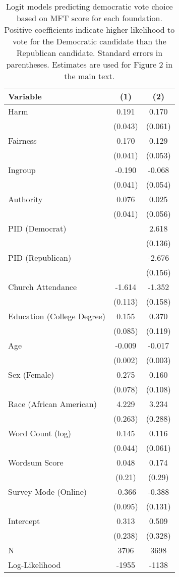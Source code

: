 \begin{table}[ht]
\centering
\caption{Logit models predicting democratic vote choice based on
           MFT score for each foundation. Positive coefficients indicate higher likelihood
           to vote for the Democratic candidate than the Republican candidate. Standard errors 
           in parentheses. Estimates are used for Figure 2 in the main text.} 
\label{tab:logit_vote}
\begingroup\footnotesize
\begin{tabular}{lcc}
  \hline
Variable & (1) & (2) \\ 
  \hline
Harm &  0.191 &  0.170 \\ 
   & (0.043) & (0.061) \\ 
  Fairness &  0.170 &  0.129 \\ 
   & (0.041) & (0.053) \\ 
  Ingroup & -0.190 & -0.068 \\ 
   & (0.041) & (0.054) \\ 
  Authority &  0.076 &  0.025 \\ 
   & (0.041) & (0.056) \\ 
  PID (Democrat) &  &  2.618 \\ 
   &  & (0.136) \\ 
  PID (Republican) &  & -2.676 \\ 
   &  & (0.156) \\ 
  Church Attendance & -1.614 & -1.352 \\ 
   & (0.113) & (0.158) \\ 
  Education (College Degree) &  0.155 &  0.370 \\ 
   & (0.085) & (0.119) \\ 
  Age & -0.009 & -0.017 \\ 
   & (0.002) & (0.003) \\ 
  Sex (Female) &  0.275 &  0.160 \\ 
   & (0.078) & (0.108) \\ 
  Race (African American) &  4.229 &  3.234 \\ 
   & (0.263) & (0.288) \\ 
  Word Count (log) &  0.145 &  0.116 \\ 
   & (0.044) & (0.061) \\ 
  Wordsum Score &  0.048 &  0.174 \\ 
   & (0.21) & (0.29) \\ 
  Survey Mode (Online) & -0.366 & -0.388 \\ 
   & (0.095) & (0.131) \\ 
  Intercept &  0.313 &  0.509 \\ 
   & (0.238) & (0.328) \\ 
   \hline
N & 3706 & 3698 \\ 
  Log-Likelihood & -1955 & -1138 \\ 
   \hline
\end{tabular}
\endgroup
\end{table}
